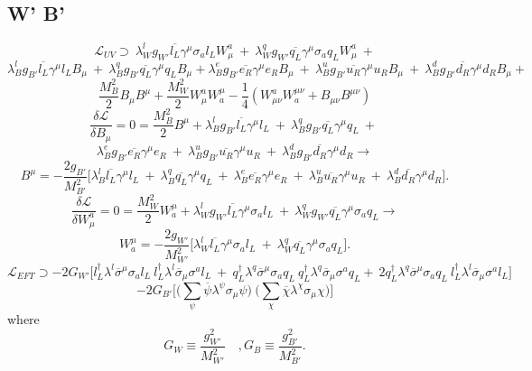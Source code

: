 \documentclass{article}
\begin{document}
\subsection{W' B'}
\[
\mathcal{L}_{UV} \supset \ \lambda^l_W g_{W'}\overline{l_L} \gamma^\mu \sigma_a l_L  W_\mu^a   \ + \ \lambda_W^q g_{W'}\overline{q_L} \gamma^\mu \sigma_a q_L  W_\mu^a   \ +
\]
\[
  \lambda^l_B g_{B'} \overline{l_L} \gamma^\mu  l_L  B_\mu  \ + \ \lambda^q_B g_{B'} \overline{q_L} \gamma^\mu  q_L  B_\mu + \lambda^e_B g_{B'} \overline{e_R} \gamma^\mu  e_R  B_\mu  \ + \ \lambda^u_B g_{B'} \overline{u_R} \gamma^\mu  u_R  B_\mu \ + \ \lambda^d_B g_{B'} \overline{d_R} \gamma^\mu  d_R  B_\mu + 
\]
\[ 
\frac{M^2_B}{2} B_\mu B^\mu + \frac{M^2_W}{2} W^{a}_\mu W^\mu_a - \frac{1}{4}(W^{a}_{\mu \nu} W^{\mu\nu}_a + B_{\mu \nu} B^{\mu \nu})
\]
\[
\frac{\delta \mathcal{L}}{\delta B_\mu} = 0 = \frac{M_B^2}{2} B^\mu + \lambda^l_B g_{B'}\overline{l_L} \gamma^\mu  l_L   \ + \ \lambda^q_B g_{B'} \overline{q_L} \gamma^\mu  q_L \ + \ 
\]
\[
\lambda^e_B g_{B'} \overline{e_R} \gamma^\mu  e_R \ + \ \lambda^u_B g_{B'} \overline{u_R} \gamma^\mu  u_R \ + \ \lambda^d_B g_{B'} \overline{d_R} \gamma^\mu  d_R\rightarrow
\]
\[
 B^\mu = -\frac{2g_{B'}}{M^2_{B'}} \big[ \lambda^l_B  \overline{l_L} \gamma^\mu  l_L   \ + \ \lambda^q_B  \overline{q_L} \gamma^\mu  q_L \ + \ \lambda^e_B  \overline{e_R} \gamma^\mu  e_R \ + \ \lambda^u_B  \overline{u_R} \gamma^\mu  u_R \ + \ \lambda^d_B  \overline{d_R} \gamma^\mu  d_R \big].
\]
\[
\frac{\delta \mathcal{L}}{\delta W^a_\mu} = 0 = \frac{M_W^2}{2} W_a^\mu + \lambda^l_W g_{W'} \overline{l_L} \gamma^\mu \sigma_a l_L   \ + \ \lambda^q_W g_{W'}\overline{q_L} \gamma^\mu \sigma_a q_L \rightarrow
\]
\[
 W_a^\mu = -\frac{2 g_{W'}}{M^2_{W'}} \big[ \lambda^l_W \overline{l_L} \gamma^\mu \sigma_a l_L   \ + \ \lambda^q_W \overline{q_L} \gamma^\mu \sigma_a q_L \big].
\]
\[
\mathcal{L}_{EFT} \supset -2G_{W'} \big[ l_L^\dagger \lambda^l \overline{\sigma}^\mu \sigma_a l_L \ l_L^\dagger \lambda^l \overline{\sigma}_\mu \sigma^a l_L \ + \ q_L^\dagger \lambda^q \overline{\sigma}^\mu \sigma_a q_L \ q_L^\dagger \lambda^q \overline{\sigma}_\mu \sigma^a q_L + \ 2 q_L^\dagger \lambda^q \overline{\sigma}^\mu \sigma_a q_L \ l_L^\dagger \lambda^l \overline{\sigma}_\mu \sigma^a l_L \big]
\]
\[
-2G_{B'} \big[ \big( \sum_{\psi} \overline{\psi} \lambda^\psi \sigma_\mu \psi \big) \ \big( \sum_{\chi} \overline{\chi} \lambda^\chi \sigma_\mu \chi \big) \big]
\]
where
\[
G_W\equiv \frac{g_{W'}^2}{M_{W'}^2} \quad, G_B\equiv \frac{g_{B'}^2}{M_{B'}^2} .
\]
\end{document}

